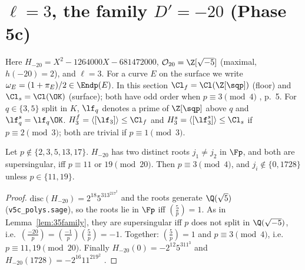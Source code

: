\section{\texorpdfstring{$\ell=3$}{l=3}, the family \texorpdfstring{$D'=-20$}{D'=-20} (Phase 5c)}\label{sec:l3m20}

Here $H_{-20}=X^2-1264000X-681472000$, $\mathcal O_{20}=\Z[\sqrt{-5}]$ (maximal, $h(-20)=2$), and
$\ell=3$.  For a curve $E$ on the surface we write $\omega_E=(1+\pi_E)/2\in\Endp(E)$.  In this
section $\Cl_f=\Cl(\Z[\sqp])$ (floor) and $\Cl_s=\Cl(\OK)$ (surface); both have odd order when
$p\equiv3\pmod4$ \cite[Lemma~3]{CPV}, p.~5.  For $q\in\{3,5\}$ split in $K$, $\lf_q$ denotes a
prime of $\Z[\sqp]$ above $q$ and $\lf_q^s=\lf_q\OK$.  $H_3^f=\langle[\lf_3]\rangle\le\Cl_f$ and
$H_3^s=\langle[\lf_3^s]\rangle\le\Cl_s$ if $p\equiv2\pmod3$; both are trivial if $p\equiv1\pmod3$.

\begin{lemma}\label{lem:20family}
Let $p\notin\{2,3,5,13,17\}$.  $H_{-20}$ has two distinct roots $j_1\neq j_2$ in $\Fp$, and both are
supersingular, iff $p\equiv11$ or $19\pmod{20}$.  Then $p\equiv3\pmod4$, and $j_i\notin\{0,1728\}$
unless $p\in\{11,19\}$.
\end{lemma}
\begin{proof}
$\mathrm{disc}(H_{-20})=2^{18}5^313^217^2$ and the roots generate $\Q(\sqrt5)$ \tagX{}
(\texttt{v5c\_polys.sage}), so the roots lie in $\Fp$ iff $(\frac5p)=1$.  As in
Lemma~\ref{lem:35family}, they are supersingular iff $p$ does not split in $\Q(\sqrt{-5})$, i.e.\
$(\frac{-20}p)=(\frac{-1}p)(\frac5p)=-1$.  Together: $(\frac5p)=1$ and $p\equiv3\pmod4$, i.e.\
$p\equiv11,19\pmod{20}$.  Finally $H_{-20}(0)=-2^{12}5^311^3$ and $H_{-20}(1728)=-2^{16}11^219^2$
\tagX.
\end{proof}

